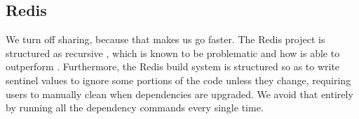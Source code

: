 \subsection{Redis}
\label{sec:eval:redis}


We turn off sharing, because that makes us go faster. The Redis project is structured as recursive \Make, which is known to be problematic \cite{miller:recursive_make} and how \Rattle is able to outperform \Make. Furthermore, the Redis build system is structured so as to write sentinel values to ignore some portions of the code unless they change, requiring users to manually clean when dependencies are upgraded. We avoid that entirely by running all the dependency commands every single time.

\begin{comment}
\subsection{Reimplementing Stack}

\Rattle assumes that each command is atomic - it cannot be subdivided into smaller parts. If a command is secretly two independent commands then they should usually be expressed as such so they can be individually skipped.

Compound commands: Sometimes a command will produce something that is user specific (not great for caching), but the next step will remove the user specificity (good for caching). To fix that we allow compound commands, by conjoining two commands with \texttt{\&\&}. Sometimes the sole purpose of the second command can be to strip machine-unique data from the first command.

As another example, the GHC package database has additional entries added every time a package is installed, making the output a consequence of the original file\footnote{As a consequence many build systems, including \Bazel and \Rattle, use multiple package databases with only one entry per database}.

and some memoisation operations (\texttt{memo})
\end{comment}

